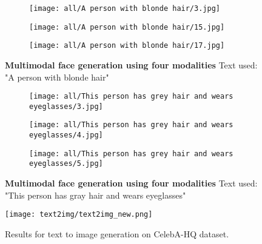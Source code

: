 \documentclass[10pt,twocolumn,letterpaper]{article}
\begin{document}
\begin{figure*}[t!]
\begin{subfigure}[t]{\linewidth}
    \end{subfigure}
      \begin{subfigure}[t]{\linewidth}
      \captionsetup{justification=centering, labelformat=empty, font=scriptsize}
  \texttt{[image: all/A person with blonde hair/3.jpg]}

    \end{subfigure}
     \begin{subfigure}[t]{\linewidth}
      \captionsetup{justification=centering, labelformat=empty, font=scriptsize}
  \texttt{[image: all/A person with blonde hair/15.jpg]}

    \end{subfigure}
\begin{subfigure}[t]{\linewidth}
      \captionsetup{justification=centering, labelformat=empty, font=scriptsize}
  \texttt{[image: all/A person with blonde hair/17.jpg]}

    \end{subfigure}

    \vspace{-3mm}    \caption{\textbf{Multimodal face generation using four modalities} Text used: "A person with blonde hair" }
    \label{fig:facesematicsupp2}
  \end{figure*} \begin{figure*}[t!]
    \centering
    \begin{subfigure}[t]{\linewidth}
      \captionsetup{justification=centering, labelformat=empty, font=scriptsize}
\texttt{[image: all/This person has grey hair and wears eyeglasses/3.jpg]}

    \end{subfigure}
       \begin{subfigure}[t]{\linewidth}
      \captionsetup{justification=centering, labelformat=empty, font=scriptsize}
  \texttt{[image: all/This person has grey hair and wears eyeglasses/4.jpg]}

    \end{subfigure}
      \begin{subfigure}[t]{\linewidth}
      \captionsetup{justification=centering, labelformat=empty, font=scriptsize}
  \texttt{[image: all/This person has grey hair and wears eyeglasses/5.jpg]}

    \end{subfigure}
    
    \vspace{-3mm}    \caption{\textbf{Multimodal face generation using four modalities} Text used: "This person has gray hair and wears eyeglasses" }
    \label{fig:facesematicsupp4}
  \end{figure*}  \begin{figure*}[t!]
	\centering
			\texttt{[image: text2img/text2img\_new.png]}
	\centering
	\caption{Results for text to image generation on CelebA-HQ dataset.}
	\label{fig:t2im}
	\vskip -10pt
\end{figure*}

 
\end{document}
